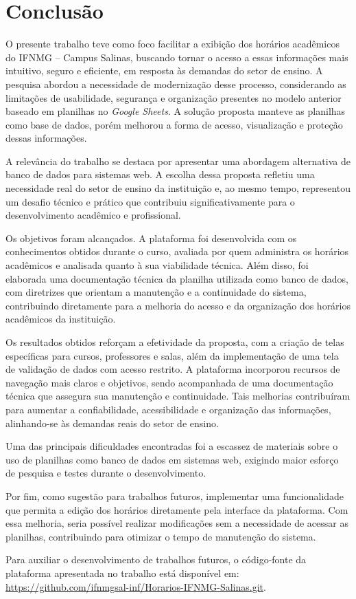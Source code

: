 \chapter{Conclusão} 
\label{cap6_conclusao} 

O presente trabalho teve como foco facilitar a exibição dos horários acadêmicos do IFNMG – Campus Salinas, buscando tornar o acesso a essas informações mais intuitivo, seguro e eficiente, em resposta às demandas do setor de ensino. A pesquisa abordou a necessidade de modernização desse processo, considerando as limitações de usabilidade, segurança e organização presentes no modelo anterior baseado em planilhas no \textit{Google Sheets}. A solução proposta manteve as planilhas como base de dados, porém melhorou a forma de acesso, visualização e proteção dessas informações.

A relevância do trabalho se destaca por apresentar uma abordagem alternativa de banco de dados para sistemas web. A escolha dessa proposta refletiu uma necessidade real do setor de ensino da instituição e, ao mesmo tempo, representou um desafio técnico e prático que contribuiu significativamente para o desenvolvimento acadêmico e profissional.

Os objetivos foram alcançados. A plataforma foi desenvolvida com os conhecimentos obtidos durante o curso, avaliada por quem administra os horários acadêmicos e analisada quanto à sua viabilidade técnica. Além disso, foi elaborada uma documentação técnica da planilha utilizada como banco de dados, com diretrizes que orientam a manutenção e a continuidade do sistema, contribuindo diretamente para a melhoria do acesso e da organização dos horários acadêmicos da instituição.

Os resultados obtidos reforçam a efetividade da proposta, com a criação de telas específicas para cursos, professores e salas, além da implementação de uma tela de validação de dados com acesso restrito. A plataforma incorporou recursos de navegação mais claros e objetivos, sendo acompanhada de uma documentação técnica que assegura sua manutenção e continuidade. Tais melhorias contribuíram para aumentar a confiabilidade, acessibilidade e organização das informações, alinhando-se às demandas reais do setor de ensino.

Uma das principais dificuldades encontradas foi a escassez de materiais sobre o uso de planilhas como banco de dados em sistemas web, exigindo maior esforço de pesquisa e testes durante o desenvolvimento.

Por fim, como sugestão para trabalhos futuros, implementar uma funcionalidade que permita a edição dos horários diretamente pela interface da plataforma. Com essa melhoria, seria possível realizar modificações sem a necessidade de acessar as planilhas, contribuindo para otimizar o tempo de manutenção do sistema.

Para auxiliar o desenvolvimento de trabalhos futuros, o código-fonte da plataforma apresentada no trabalho está disponível em: \url{https://github.com/ifnmgsal-inf/Horarios-IFNMG-Salinas.git}.